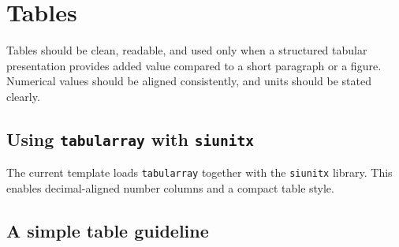 \documentclass[11pt,a4paper]{report}
\begin{document}
\chapter{Tables}

Tables should be clean, readable, and used only when a structured tabular presentation provides added value compared to a short paragraph or a figure. Numerical values should be aligned consistently, and units should be stated clearly.

\section{Using \texttt{tabularray} with \texttt{siunitx}}

The current template loads \texttt{tabularray} together with the \texttt{siunitx} library. This enables decimal-aligned number columns and a compact table style.
\begin{table}[h]
\centering
\caption{Example of a table created with \texttt{tabularray} and \texttt{siunitx}.}
\label{tab:power-plant-example}
\end{table}

\section{A simple table guideline}
\end{document}
